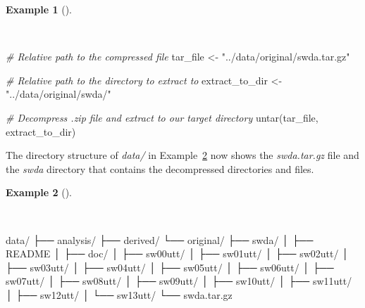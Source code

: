 \documentclass[
  letterpaper,
]{latex/krantz}
\newenvironment{Shaded}{\begin{snugshade}}{\end{snugshade}}
\newcommand{\CommentTok}[1]{\textcolor[rgb]{0.00,0.00,0.00}{\textit{#1}}}
\newcommand{\ExtensionTok}[1]{\textcolor[rgb]{0.00,0.00,0.00}{#1}}
\newcommand{\FunctionTok}[1]{\textcolor[rgb]{0.00,0.00,0.00}{#1}}
\newcommand{\NormalTok}[1]{\textcolor[rgb]{0.00,0.00,0.00}{#1}}
\newcommand{\OtherTok}[1]{\textcolor[rgb]{0.00,0.00,0.00}{#1}}
\newcommand{\StringTok}[1]{\textcolor[rgb]{0.00,0.00,0.00}{#1}}
\theoremstyle{definition}
\newtheorem{example}{Example}[chapter]
\theoremstyle{remark}
\begin{document}
\begin{example}[]\protect\hypertarget{exm-ad-swda-decompress-file}{}\label{exm-ad-swda-decompress-file}

~

\begin{Shaded}
\begin{Highlighting}[]
\CommentTok{\# Relative path to the compressed file}
\NormalTok{tar\_file }\OtherTok{\textless{}{-}} \StringTok{"../data/original/swda.tar.gz"}

\CommentTok{\# Relative path to the directory to extract to}
\NormalTok{extract\_to\_dir }\OtherTok{\textless{}{-}} \StringTok{"../data/original/swda/"}

\CommentTok{\# Decompress .zip file and extract to our target directory}
\FunctionTok{untar}\NormalTok{(tar\_file, extract\_to\_dir)}
\end{Highlighting}
\end{Shaded}

\end{example}

The directory structure of \emph{data/} in
Example~\ref{exm-ad-swda-decompress-location} now shows the
\emph{swda.tar.gz} file and the \emph{swda} directory that contains the
decompressed directories and files.

\begin{example}[]\protect\hypertarget{exm-ad-swda-decompress-location}{}\label{exm-ad-swda-decompress-location}

~

\begin{Shaded}
\begin{Highlighting}[]
\ExtensionTok{data/}
\ExtensionTok{├──}\NormalTok{ analysis/}
\ExtensionTok{├──}\NormalTok{ derived/}
\ExtensionTok{└──}\NormalTok{ original/}
    \ExtensionTok{├──}\NormalTok{ swda/}
    \ExtensionTok{│}\NormalTok{   ├── README}
    \ExtensionTok{│}\NormalTok{   ├── doc/}
    \ExtensionTok{│}\NormalTok{   ├── sw00utt/}
    \ExtensionTok{│}\NormalTok{   ├── sw01utt/}
    \ExtensionTok{│}\NormalTok{   ├── sw02utt/}
    \ExtensionTok{│}\NormalTok{   ├── sw03utt/}
    \ExtensionTok{│}\NormalTok{   ├── sw04utt/}
    \ExtensionTok{│}\NormalTok{   ├── sw05utt/}
    \ExtensionTok{│}\NormalTok{   ├── sw06utt/}
    \ExtensionTok{│}\NormalTok{   ├── sw07utt/}
    \ExtensionTok{│}\NormalTok{   ├── sw08utt/}
    \ExtensionTok{│}\NormalTok{   ├── sw09utt/}
    \ExtensionTok{│}\NormalTok{   ├── sw10utt/}
    \ExtensionTok{│}\NormalTok{   ├── sw11utt/}
    \ExtensionTok{│}\NormalTok{   ├── sw12utt/}
    \ExtensionTok{│}\NormalTok{   └── sw13utt/}
    \ExtensionTok{└──}\NormalTok{ swda.tar.gz}
\end{Highlighting}
\end{Shaded}

\end{example}
\end{document}
